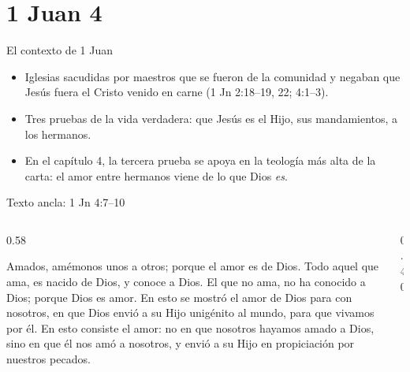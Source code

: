 \section{1 Juan 4}

\begin{frame}{El contexto de 1 Juan}
\small\begin{itemize}
\item Iglesias sacudidas por maestros que se fueron de la comunidad y negaban que Jesús fuera el Cristo venido en carne (1 Jn 2:18--19, 22; 4:1--3).
\item Tres pruebas de la vida verdadera:  que Jesús es el Hijo,  sus mandamientos,  a los hermanos.
\item En el capítulo 4, la tercera prueba se apoya en la teología más alta de la carta: el amor entre hermanos viene de lo que Dios \emph{es}.
\end{itemize}\medskip
{}
\end{frame}

\begin{frame}{Texto ancla: 1 Jn 4:7--10}
\begin{columns}[c,onlytextwidth]
\begin{column}{0.58\textwidth}
\begin{cita}Amados, amémonos unos a otros; porque el amor es de Dios. Todo aquel que ama, es nacido de Dios, y conoce a Dios. El que no ama, no ha conocido a Dios; porque Dios es amor. En esto se mostró el amor de Dios para con nosotros, en que Dios envió a su Hijo unigénito al mundo, para que vivamos por él. En esto consiste el amor: no en que nosotros hayamos amado a Dios, sino en que él nos amó a nosotros, y envió a su Hijo en propiciación por nuestros pecados.\end{cita}
\end{column}
\begin{column}{0.40\textwidth}\end{column}
\end{columns}
\end{frame}

